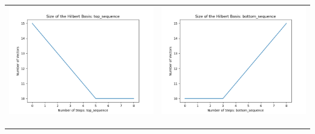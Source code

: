 \documentclass[10pt]{article}
\begin{document}
\begin{tabular}{c|c}
\begin{minipage}{.4\textwidth}
\includegraphics[width=\textwidth]{"DATA/4d/4 generators 2 bound B/top_sequence SIZE"}
\end{minipage} &
\begin{minipage}{.4\textwidth}
\includegraphics[width=\textwidth]{"DATA/4d/4 generators 2 bound B bottomup/bottom_sequence SIZE"}
\end{minipage} \\ \\
\hline \\\begin{minipage}{.4\textwidth}

\end{minipage}
\end{tabular}
\end{document}
